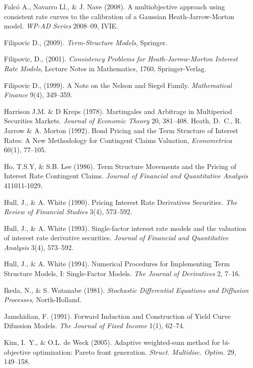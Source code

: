 \begin{thebibliography}{}
{\sc Falc\'o A., Navarro Ll., \& J. Nave (2008)}. A multiobjective approach using
consistent rate curves to the calibration of a Gaussian
Heath-Jarrow-Morton model. \emph{WP-AD Series} 2008--09, IVIE. 

{\sc Filipovic D., (2009).} \emph{Term-Structure Models}, Springer. 

{\sc Filipovic, D., (2001).} \emph{Consistency Problems for
Heath-Jarrow-Morton Interest Rate Models}, Lecture Notes in
Mathematics, 1760, Springer-Verlag. 

{\sc Filipovic D., (1999).} A Note on the Nelson and Siegel
Family. \emph{Mathematical Finance} 9(4), 349--359.  

{\sc Harrison J.M. \& D Kreps (1978).} Martingales and Arbitrage in
Multiperiod Securities Markets. \emph{Journal of Economic Theory} 20,
381--408.
{\sc Heath, D.~C., R. Jarrow \& A. Morton (1992).} Bond Pricing and the
Term Structure of Interest Rates: A New Methodology for Contingent
Claims Valuation, \emph{Econometrica} 60(1), 77--105.  

{\sc Ho, T.S.Y, \& S.B. Lee (1986).} Term Structure Movements and the
Pricing of Interest Rate Contingent Claims. \emph{Journal of Financial
  and Quantitative Analysis} 411011-1029.

{\sc Hull, J., \& A. White (1990).} Pricing Interest Rate
Derivatives Securities. \emph{The Review of Financial Studies}
3(4), 573--592.

{\sc Hull, J., \& A. White (1993).} Single-factor interest rate
models and the valuation of interest rate derivative
securities. \emph{Journal of Financial and Quantitative Analysis}
3(4), 573--592. 

{\sc Hull, J., \& A. White (1994).} Numerical Procedures for
Implementing Term Structure Models, I: Single-Factor Models. \emph{The
Journal of Derivatives} 2, 7--16. 

{\sc Ikeda, N., \& S. Watanabe (1981).} \emph{Stochastic Differential
Equations and Diffusion Processes}, North-Holland.

{\sc Jamshidian, F. (1991).} Forward Induction and Construction of
Yield Curve Difussion Models. \emph{The Journal of Fixed Income} 1(1),
62--74.

{\sc Kim, I.~Y., \& O.L. de Weck (2005).} Adaptive weighted-sum method
for bi-objective optimization: Pareto front
generation. \emph{Struct. Multidisc. Optim.} 29, 149--158.    


\end{thebibliography}
